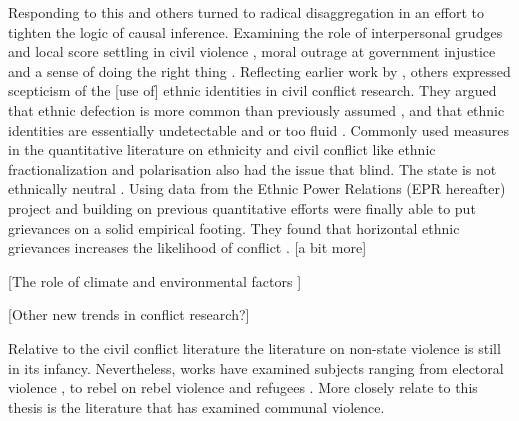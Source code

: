 \documentclass[12pt]{article}
\begin{document}
Responding to this \citet{Kalyvas2006} and others turned to radical
disaggregation in an effort to tighten the logic of causal inference. Examining
the role of interpersonal grudges and local score settling in civil violence
\citep{Kalyvas2006, Kalyvas_2008}, moral outrage at government injustice and a
sense of doing the right thing \citep{Wood2003}. Reflecting earlier work by
\citet{barth1969}, others expressed scepticism of the [use of] ethnic identities
in civil conflict research. They argued that ethnic defection is more common
than previously assumed \citep{Kalyvas_2008, Staniland_2012}, and that ethnic
identities are essentially undetectable and or too fluid \citep{Gilley_2004,
Chandra2006}. Commonly used measures in the quantitative literature on ethnicity
and civil conflict like ethnic fractionalization \citep{Alesina2003,
Posner2004} and polarisation \citep{Montalvo2005} also had the issue that 
blind. The state is not ethnically neutral \citep{CedermanLars-Erik2013Igac}.
Using data from the Ethnic Power Relations (EPR hereafter) project
\citet{CedermanLars-Erik2013Igac} and building on previous quantitative efforts
\citep{Gurr_1993, Goldstone_2010} were finally able to put grievances on a solid
empirical footing. They found that horizontal ethnic grievances
increases the likelihood of conflict \citep{CedermanLars-Erik2013Igac}. [a bit
more]

[The role of climate and environmental factors \citep{Detges_2017,
von_Uexkull_2021}]

[Other new trends in conflict research?]

Relative to the civil conflict literature the literature on non-state violence
is still in its infancy. Nevertheless, works have examined subjects ranging from
electoral violence \citep{Fjelde_2020, Salehyan_2014, Burchard_2015}, to rebel
on rebel violence \citep{Fjelde_2012, Lilja_2011, Cunningham_2012, Nygard_2014}
and refugees \citep{Bohmelt_2018}. More closely relate to this thesis is the
literature that has examined communal violence.
\end{document}
